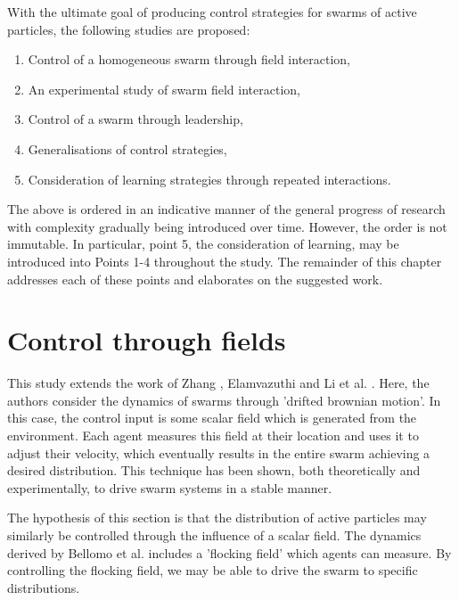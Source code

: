 \documentclass[../sample.tex]{subfiles}
\begin{document}
	With the ultimate goal of producing control strategies for swarms of active particles, the
	following studies are proposed:

	\begin{enumerate}
		\item Control of a homogeneous swarm through field interaction,
		\item An experimental study of swarm field interaction,
		\item Control of a swarm through leadership,
		\item Generalisations of control strategies,
		\item Consideration of learning strategies through repeated interactions.
	\end{enumerate}

	The above is ordered in an indicative manner of the general progress of research with
	complexity gradually being introduced over time. However, the order is not immutable. In
	particular, point 5, the consideration of learning, may be introduced into Points 1-4 throughout the study. The remainder of this chapter addresses each of these points and elaborates on the
	suggested work.

	\section{Control through fields} %
	\label{sub:control_through_fields}
	
	This study extends the work of Zhang \cite{Zhang2018}, Elamvazuthi \cite{Elamvazhuthi2019} and
	Li et al. \cite{Li2017}. Here, the authors consider the dynamics of swarms through 'drifted
	brownian motion'. In this case, the control input is some scalar field which is generated from the
	environment. Each agent measures this field at their location and uses it to adjust their
	velocity, which eventually results in the entire swarm achieving a desired distribution. This technique
	has been shown, both theoretically and experimentally, to drive swarm systems in a stable
	manner.

	The hypothesis of this section is that the distribution of active particles may
	similarly be controlled through the influence of a scalar field. The dynamics derived by Bellomo
	et al. \cite{Bellomo2017} includes a 'flocking field' which agents can measure. By controlling
	the flocking field, we may be able to drive the swarm to specific
	distributions. 
\end{document}
